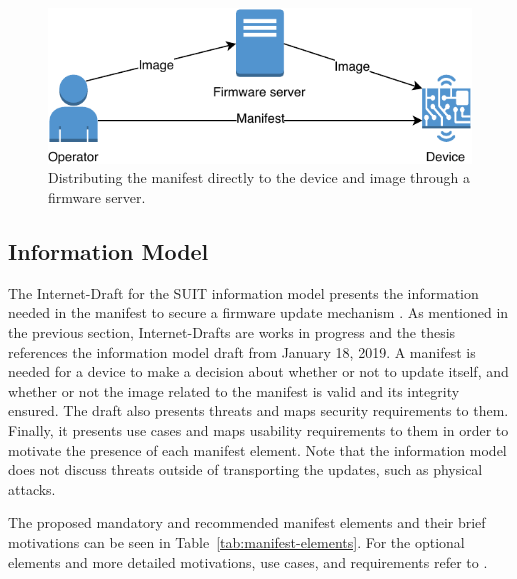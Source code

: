 \documentclass[0-thesis.tex]{subfiles}
\begin{document}
\begin{figure}
    \caption{Distributing the manifest directly to the device and image through a firmware server.}
    \label{fig:manifest-image-separate-distribution}
    \includegraphics{images/separate.pdf}
\end{figure}

\subsection{Information Model}
\label{ssec:information-model}
The Internet-Draft for the SUIT information model presents the information needed in the
manifest to secure a firmware update mechanism \parencite{suit-information-model}. As
mentioned in the previous section, Internet-Drafts are works in progress and the thesis
references the information model draft from January 18, 2019. A manifest is needed for a
device to make a decision about whether or not to update itself, and whether or not the
image related to the manifest is valid and its integrity ensured. The draft also presents
threats and maps security requirements to them. Finally, it presents use cases and maps
usability requirements to them in order to motivate the presence of each manifest element.
Note that the information model does not discuss threats outside of transporting the
updates, such as physical attacks.

The proposed mandatory and recommended manifest elements and their brief motivations can
be seen in Table~\ref{tab:manifest-elements}. For the optional elements and more detailed
motivations, use cases, and requirements refer to \parencite{suit-information-model}.
\end{document}
